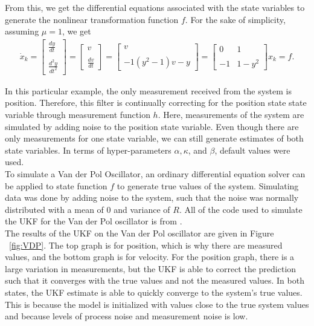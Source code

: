 \noindent From this, we get the differential equations associated with the state variables to generate the nonlinear transformation function $f$. For the sake of simplicity, assuming $\mu = 1$, we get
\begin{align*}
\dot x_k  = 
	\begin{bmatrix}
           \frac{dy}{dt}  \\ \\
           \frac{d^2y}{dt^2} 
           \end{bmatrix} = 
           \begin{bmatrix}
          v \\ \\
           \frac{dv}{dt} 
           \end{bmatrix}  =
           \begin{bmatrix}
           v \\ \\
           -1 (y^2 - 1)v - y 
           \end{bmatrix}=
           \begin{bmatrix}
           0 & 1 \\ \\
           -1& 1- y^2 
           \end{bmatrix} x_k 
           =
           f.
\end{align*}


\noindent In this particular example, the only measurement received from the system is position. Therefore, this filter is continually correcting for the position state state variable through measurement function $h$. Here, measurements of the system are simulated by adding noise to the position state variable. Even though there are only measurements for one state variable, we can still generate estimates of both state variables. In terms of hyper-parameters $\alpha, \kappa$, and $\beta$, default values were used.\\ 

\noindent To simulate a Van der Pol Oscillator, an ordinary differential equation solver can be applied to state function $f$ to generate true values of the system. Simulating data was done by adding noise to the system, such that the noise was normally distributed with a mean of 0 and variance of $R$. All of the code used to simulate the UKF for the Van der Pol oscillator is from \cite{matlab_simulink}. \\

\noindent The results of the UKF on the Van der Pol oscillator are given in Figure ~\ref{fig:VDP}. The top graph is for position, which is why there are measured values, and the bottom graph is for velocity. For the position graph, there is a large variation in measurements, but the UKF is able to correct the prediction such that it converges with the true values and not the measured values. In both states, the UKF estimate is able to quickly converge to the system's true values. This is because the model is initialized with values close to the true system values and because levels of process noise and measurement noise is low.  \\

